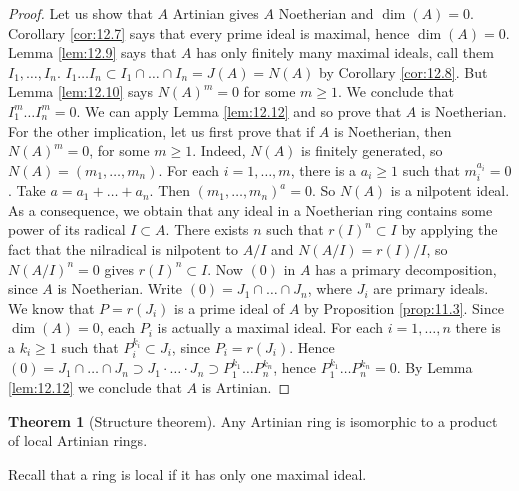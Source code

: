 \documentclass{article}
\newcommand{\rb}[1]{\left( #1 \right)}
\theoremstyle{definition}\newtheorem{definition}{Definition}[section]
\theoremstyle{definition}\newtheorem{remark}[definition]{Remark}
\theoremstyle{definition}\newtheorem*{example}{Example}
\theoremstyle{definition}\newtheorem*{note}{Note}
\newtheorem{theorem}[definition]{Theorem}
\begin{document}
\begin{proof}
Let us show that $ A $ Artinian gives $ A $ Noetherian and $ \dim\rb{A} = 0 $. Corollary \ref{cor:12.7} says that every prime ideal is maximal, hence $ \dim\rb{A} = 0 $. Lemma \ref{lem:12.9} says that $ A $ has only finitely many maximal ideals, call them $ I_1, \dots, I_n $. $ I_1 \dots I_n \subset I_1 \cap \dots \cap I_n = J\rb{A} = N\rb{A} $ by Corollary \ref{cor:12.8}. But Lemma \ref{lem:12.10} says $ N\rb{A}^m = 0 $ for some $ m \ge 1 $. We conclude that $ I_1^m \dots I_n^m = 0 $. We can apply Lemma \ref{lem:12.12} and so prove that $ A $ is Noetherian. For the other implication, let us first prove that if $ A $ is Noetherian, then $ N\rb{A}^m = 0 $, for some $ m \ge 1 $. Indeed, $ N\rb{A} $ is finitely generated, so $ N\rb{A} = \rb{m_1, \dots, m_n} $. For each $ i = 1, \dots, m $, there is a $ a_i \ge 1 $ such that $ m_i^{a_i} = 0 $. Take $ a = a_1 + \dots + a_n $. Then $ \rb{m_1, \dots, m_n}^a = 0 $. So $ N\rb{A} $ is a nilpotent ideal. As a consequence, we obtain that any ideal in a Noetherian ring contains some power of its radical $ I \subset A $. There exists $ n $ such that $ r\rb{I}^n \subset I $ by applying the fact that the nilradical is nilpotent to $ A / I $ and $ N\rb{A / I} = r\rb{I} / I $, so $ N\rb{A / I}^n = 0 $ gives $ r\rb{I}^n \subset I $. Now $ \rb{0} $ in $ A $ has a primary decomposition, since $ A $ is Noetherian. Write $ \rb{0} = J_1 \cap \dots \cap J_n $, where $ J_i $ are primary ideals. We know that $ P = r\rb{J_i} $ is a prime ideal of $ A $ by Proposition \ref{prop:11.3}. Since $ \dim\rb{A} = 0 $, each $ P_i $ is actually a maximal ideal. For each $ i = 1, \dots, n $ there is a $ k_i \ge 1 $ such that $ P_i^{k_i} \subset J_i $, since $ P_i = r\rb{J_i} $. Hence $ \rb{0} = J_1 \cap \dots \cap J_n \supset J_1 \cdot \dots \cdot J_n \supset P_1^{k_1} \dots P_n^{k_n} $, hence $ P_1^{k_1} \dots P_n^{k_n} = 0 $. By Lemma \ref{lem:12.12} we conclude that $ A $ is Artinian.
\end{proof}


\begin{theorem}[Structure theorem]
\label{thm:12.15}
Any Artinian ring is isomorphic to a product of local Artinian rings.
\end{theorem}

Recall that a ring is local if it has only one maximal ideal.
\end{document}

